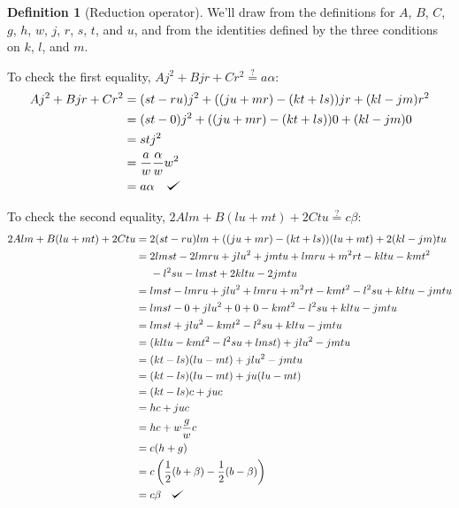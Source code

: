 \documentclass{article}
\def\checkmark{\tikz\fill[scale=0.4](0,.35) -- (.25,0) -- (1,.7) -- (.25,.15) -- cycle;}
\theoremstyle{definition}
\newtheorem{definition}{Definition}[section]
\theoremstyle{theorem}
\theoremstyle{example}
\theoremstyle{corollary}
\begin{document}
\begin{definition}[Reduction operator]
\bigskip

We'll draw from the definitions for \(A\), \(B\), \(C\), \(g\), \(h\), \(w\), \(j\), \(r\), \(s\), \(t\), and \(u\), and from the identities defined by the three conditions on \(k\), \(l\), and \(m\).

\bigskip

To check the first equality, \(A j^{2} + B j r + C r^{2} \stackrel{?}{=} a \alpha\):
\begin{align*}
A j^{2} + B j r + C r^{2} &= (s t - r u) j^{2} + ((j u + m r) - (k t + l s)) j r + (k l - j m) r^{2} \\
&= (s t - 0) j^{2} + ((j u + m r) - (k t + l s)) 0 + (k l - j m) 0 \\
& = s t j^{2} \\
&= \frac{a}{w} \frac{\alpha}{w} w^{2} \\
&= a \alpha \quad \checkmark
\end{align*}

\bigskip

To check the second equality, \(2 A l m + B (l u + m t) + 2 C t u \stackrel{?}{=} c \beta\):
\begin{align*}
2 A l m + B (l u + m t) + 2 C t u &= 2 (s t - r u) l m + ((j u  + m r) - (k t + l s)) (l u + m t) + 2 (k l - j m) t u \\
&= 2lmst - 2lmru + jlu^{2} + jmtu + lmru + m^{2}rt - kltu - kmt^{2} \\
&\phantom{=l} - l^{2}su - lmst + 2kltu - 2jmtu \\
&= lmst - lmru + jlu^{2} + lmru + m^{2}rt - kmt^{2} - l^{2}su + kltu - jmtu \\
&= lmst - 0 + jlu^{2} + 0 + 0 - kmt^{2} - l^{2}su + kltu - jmtu \\
&= lmst + jlu^{2} - kmt^{2} - l^{2}su + kltu - jmtu \\
&= (kltu - kmt^{2} - l^{2}su + lmst) + jlu^{2} - jmtu \\
&= (kt - ls) (lu - mt) + jlu^{2} - jmtu \\
&= (kt - ls) (lu - mt) + j u (lu - mt) \\
&= (kt - ls) c + ju c \\
&= hc + ju c\\
&= hc + w \frac{g}{w} c\\
&= c(h + g)\\
&= c \left(\frac{1}{2} (b + \beta) - \frac{1}{2} (b - \beta)\right) \\
&= c \beta \quad \checkmark
\end{align*}


\end{definition}
\end{document}
